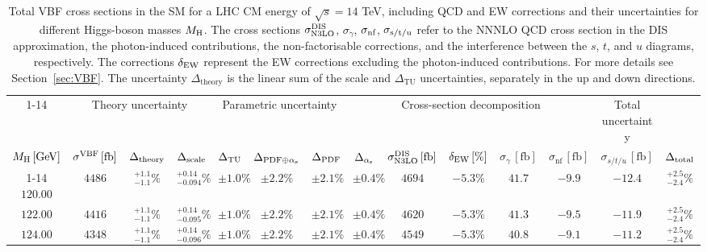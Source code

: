 \begin{landscape}
\begin{table}[ht!]
\caption{Total VBF cross sections in the SM for a LHC CM energy of $\sqrt{s}=14$ TeV, including QCD and EW corrections
and their uncertainties for different Higgs-boson masses \texorpdfstring{$M_\mathrm{H}$}\MH. 
The cross sections $\sigma_{\mathrm{N3LO}}^{\mathrm{DIS}}$, $\sigma_{\gamma}$, $\sigma_{\mbox{\scriptsize nf}}$, $\sigma_{\mbox{\scriptsize s/t/u}}$ refer to the NNNLO QCD cross section in the DIS approximation, the photon-induced contributions, the non-factorisable corrections, and the interference between the $s$, $t$, and $u$ diagrams, respectively.
The corrections $\delta_{\mathrm{EW}}$ represent the EW corrections excluding the photon-induced contributions.
For more details see Section~\ref{sec:VBF}. The uncertainty $\Delta_{\mathrm{theory}}$ is the linear sum of the scale and $\Delta_{\mathrm{TU}}$ uncertainties, separately in the up and down directions.}
\label{tab:vbf_XStot_14}
\centering
\scriptsize
{\renewcommand{\arraystretch}{1.4}
\begin{tabular}{| cc | ccc | ccc | ccc | cc | c |}
\cline{1-14}
\multicolumn{2}{|c|}{\(\sqrt{s} = 14\,\mathrm{TeV}\)} &
\multicolumn{3}{|c|}{Theory uncertainty} &
\multicolumn{3}{|c|}{Parametric uncertainty} &
\multicolumn{5}{|c|}{Cross-section decomposition} &
\multicolumn{1}{c|}{Total uncertainty} \\
\(M_\mathrm{H}\,[\mathrm{GeV}]\) & \(\sigma^{\mathrm{VBF}}\,[\mathrm{fb}]\) &
\(\Delta_{\rm theory}\) &
{\color{black!55}\(\Delta_{\rm scale}\)} & {\color{black!55}\(\Delta_{\rm TU}\)} &
\(\Delta_{\rm PDF\oplus\alpha_{\mathrm{s}}}\) &
{\color{black!55}\(\Delta_{\rm PDF}\)} & {\color{black!55}\(\Delta_{\alpha_{\mathrm{s}}}\)} &
\(\sigma_{\mathrm{N3LO}}^{\mathrm{DIS}}\,[\mathrm{fb}]\) & \(\delta_{\mathrm{EW}}\,[\%]\) & \(\sigma_\gamma\,[\mathrm{fb}]\) & \(\sigma_{\mathrm{nf}}\,[\mathrm{fb}]\) & \(\sigma_{s/t/u}\,[\mathrm{fb}]\) &
\(\Delta_{\rm total}\)
\\
\cline{1-14}
$120.00$ & $4486$ & $^{+1.1}_{-1.1}\%$ & {\color{black!55}$^{+0.14}_{-0.094}\%$} & {\color{black!55}$\pm 1.0\%$} & $\pm 2.2\%$ & {\color{black!55}$\pm 2.1\%$} & {\color{black!55}$\pm 0.4\%$} & $4694$ & $-5.3\%$ & $41.7$ & $-9.9$ & $-12.4$ & $^{+2.5}_{-2.4}\%$ \\
$122.00$ & $4416$ & $^{+1.1}_{-1.1}\%$ & {\color{black!55}$^{+0.14}_{-0.095}\%$} & {\color{black!55}$\pm 1.0\%$} & $\pm 2.2\%$ & {\color{black!55}$\pm 2.1\%$} & {\color{black!55}$\pm 0.4\%$} & $4620$ & $-5.3\%$ & $41.3$ & $-9.5$ & $-11.9$ & $^{+2.5}_{-2.4}\%$ \\
$124.00$ & $4348$ & $^{+1.1}_{-1.1}\%$ & {\color{black!55}$^{+0.14}_{-0.096}\%$} & {\color{black!55}$\pm 1.0\%$} & $\pm 2.2\%$ & {\color{black!55}$\pm 2.1\%$} & {\color{black!55}$\pm 0.4\%$} & $4549$ & $-5.3\%$ & $40.8$ & $-9.1$ & $-11.2$ & $^{+2.5}_{-2.4}\%$ \\

\end{tabular}}
\end{table}
\end{landscape}
